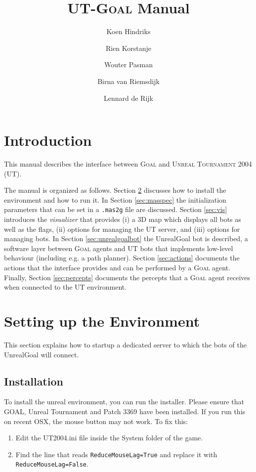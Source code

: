 \documentclass[11pt,a4paper]{article}
\newcommand{\Goal}{\textsc{Goal}}
\begin{document}
%
\title{UT-{\Goal} Manual}

%
\author{Koen Hindriks}
\author{Rien Korstanje}
\author{Wouter Pasman}
\author{Birna van Riemsdijk}
\author{Lennard de Rijk}

%
\maketitle

\newpage

%
%
%
\section{Introduction}
%

This manual describes the interface between {\Goal} and \textsc{Unreal Tournament 2004} (UT).

The manual is organized as follows. Section \ref{sec:setup} discusses how to install the environment and how to run it. In Section \ref{sec:masspec} the initialization parameters that can be set in a \texttt{.mas2g} file are discussed. Section \ref{sec:vis} introduces the \emph{visualizer} that provides (i) a 3D map which displays all bots as well as the flags, (ii) options for managing the UT server, and (iii) options for managing bots. In Section \ref{sec:unrealgoalbot} the UnrealGoal bot is described, a software layer between {\Goal} agents and UT bots that implements low-level behaviour (including e.g. a path planner). Section \ref{sec:actions} documents the actions that the interface provides and can be performed by a {\Goal} agent. Finally, Section \ref{sec:percepts} documents the percepts that a {\Goal} agent receives when connected to the UT environment.


%
%
%
\section{Setting up the Environment}\label{sec:setup}

This section explains how to startup a dedicated server to which the bots of the UnrealGoal  will connect. 

\subsection{Installation}

To install the unreal environment, you can run the installer.  Please ensure that GOAL, Unreal Tournament and Patch 3369 have been installed. 
If you run this on recent OSX, the mouse button may not work. To fix this:
\begin{enumerate}
\item Edit the UT2004.ini file inside the System folder of the game.
\item Find the line that reads \verb|ReduceMouseLag=True| and replace it with \verb|ReduceMouseLag=False|.
\end{enumerate}
\end{document}
